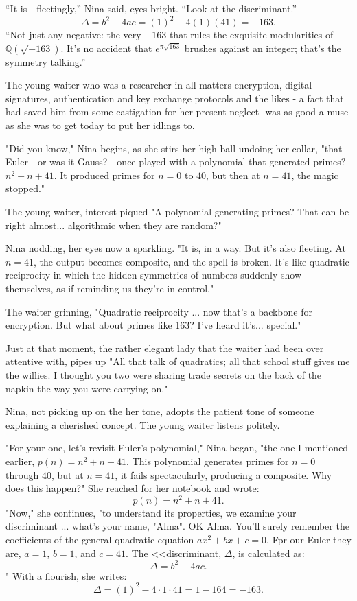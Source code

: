 “It is—fleetingly,” Nina said, eyes bright. “Look at the discriminant.”
\[
\Delta=b^2-4ac=(1)^2-4(1)(41)=-163.
\]
“Not just any negative: the very \(-163\) that rules the exquisite modularities of \( \mathbb{Q}(\sqrt{-163}) \). It’s no accident that \(e^{\pi\sqrt{163}}\) brushes against an integer; that’s the symmetry talking.”



The young waiter who was a researcher in all matters encryption, digital signatures, authentication and key exchange protocols and the likes - a fact that had saved him from some castigation for her present neglect- was as good a muse as she was to get today to put her idlings to.

"Did you know," Nina begins, as she stirs her high ball undoing her collar, "that Euler—or was it Gauss?—once played with a polynomial that generated primes? \(n^2 + n + 41\). It produced primes for \(n = 0\) to \(40\), but then at \(n = 41\), the magic stopped."

The young waiter, interest piqued "A polynomial generating primes? That can be right almost... algorithmic when they are random?"

Nina nodding, her eyes now a sparkling. "It is, in a way. But it’s also fleeting. At \(n = 41\), the output becomes composite, and the spell is broken. It’s like quadratic reciprocity in which the hidden symmetries of numbers suddenly show themselves, as if reminding us they’re in control."

The waiter grinning, "Quadratic reciprocity ... now that’s a backbone for encryption. But what about primes like 163? I’ve heard it’s... special."

Just at that moment, the rather elegant lady that the waiter had been over attentive with, pipes up "All that talk of quadratics; all that school stuff gives me the willies. I thought you two were sharing trade secrets on the back of the napkin the way you were carrying on."

Nina, not picking up on the her tone, adopts the patient tone of someone explaining a cherished concept. The young waiter listens politely.

"For your one, let’s revisit Euler’s polynomial," Nina began, "the one I mentioned earlier, \(p(n) = n^2 + n + 41\). This polynomial generates primes for \(n = 0\) through \(40\), but at \(n = 41\), it fails spectacularly, producing a composite. Why does this happen?" She reached for her notebook and wrote:
\[
p(n) = n^2 + n + 41.
\]
"Now," she continues, "to understand its properties, we examine your discriminant ... what's your name, "Alma". OK Alma. You'll surely remember the coefficients of the general quadratic equation \(ax^2 + bx + c = 0\). Fpr our Euler they are, \(a = 1\), \(b = 1\), and \(c = 41\). The <<discriminant, \(\Delta\), is calculated as:
\[
\Delta = b^2 - 4ac.
\]"
With a flourish, she writes:
\[
\Delta = (1)^2 - 4 \cdot 1 \cdot 41 = 1 - 164 = -163.
\]

